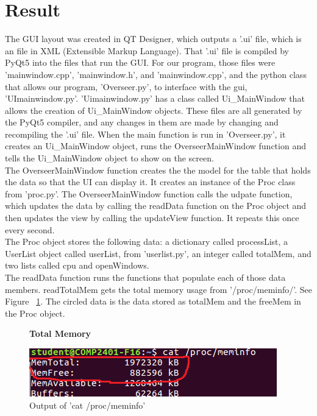 \documentclass[12pt]{article}
\begin{document}
	
\section{Result}

The GUI layout was created in QT Designer, which outputs a '.ui' file, which is an file in XML (Extensible Markup Language).
That '.ui' file is compiled by PyQt5 into the files that run the GUI.
For our program, those files were 'mainwindow.cpp', 'mainwindow.h', and 'mainwindow.cpp', and the python class that allows our program, 'Overseer.py', to interface with the gui, 'UImainwindow.py'.
'Uimainwindow.py' has a class called Ui\_MainWindow that allows the creation of Ui\_MainWindow objects.
These files are all generated by the PyQt5 compiler, and any changes in them are made by changing and recompiling the '.ui' file.
When the main function is run in 'Overseer.py', it creates an Ui\_MainWindow object, runs the OverseerMainWindow function and tells the Ui\_MainWindow object to show on the screen.\\
The OverseerMainWindow function creates the the model for the table that holds the data so that the UI can display it.
It creates an instance of the Proc class from 'proc.py'.
The OverseerMainWindow function calls the udpate function, which updates the data by calling the readData function on the Proc object and then updates the view by calling the updateView function.
It repeats this once every second.\\
The Proc object stores the following data: a dictionary called processList, a UserList object called userList, from 'userlist.py', an integer called totalMem, and two lists called cpu and openWindows.\\
The readData function runs the functions that populate each of those data members.
readTotalMem gets the total memory usage from '/proc/meminfo/'.
See Figure ~\ref{figTotalMem}.
The circled data is the data stored as totalMem and the freeMem in the Proc object.
\begin{figure}[h]
	\centering
	\textbf{Total Memory}\par\medskip
	\includegraphics{totalMem}
	\caption{Output of 'cat /proc/meminfo'}
	\label{figTotalMem}
\end{figure}
\end{document}
